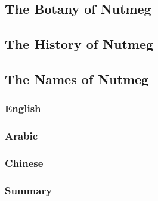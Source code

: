 \subsection{The Botany of Nutmeg}

\subsection{The History of Nutmeg}

\subsection{The Names of Nutmeg}

\subsubsection{English}





\subsubsection{Arabic}



\subsubsection{Chinese}



\subsubsection{Summary}



































